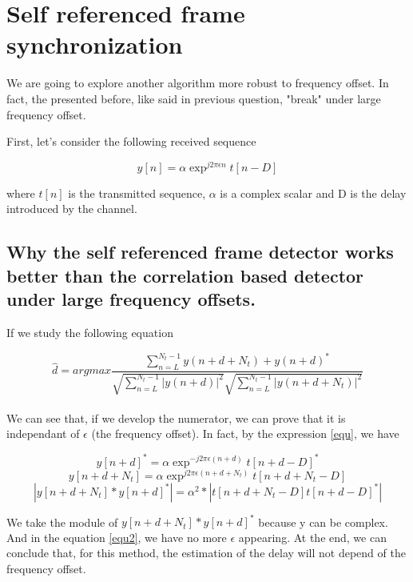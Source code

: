\documentclass[frenchb, oneside, headings=normal]{scrartcl}
\begin{document}
\section{Self referenced frame synchronization}

We are going to explore another algorithm more robust to frequency offset. In fact, the presented before, like said in previous question, "break" under large frequency offset.

First, let's consider the following received sequence

\begin{equation}
y[n] = 	\alpha \exp^{j2\pi \epsilon n}t[n-D]
\label{equ} 
\end{equation}

where $t[n]$ is the transmitted sequence, $\alpha$ is a complex scalar and D is the delay 	introduced by the channel.

\subsection{Why the self referenced frame detector works better than the correlation based detector under large frequency offsets.}

If we study the following equation

\begin{equation}
\hat{d}=argmax \frac{\sum_{n=L}^{N_t-1} y(n+d+N_t)+y(n+d)^*}{\sqrt{\sum_{n=L}^{N_t-1} |y(n+d)|^2}\sqrt{\sum_{n=L}^{N_t-1} |y(n+d+N_t)|^2}}
\end{equation}\\

We can see that, if we develop the numerator, we can prove that it is independant of $\epsilon$ (the frequency offset). In fact, by the expression \ref{equ}, we have

\begin{equation}
y[n+d]^*= \alpha \exp^{-j2\pi \epsilon (n+d)}t[n+d-D]^*
\end{equation}
\begin{equation}
y[n+d+N_t]= \alpha \exp^{j2\pi \epsilon (n+d+N_t)}t[n+d+N_t-D]
\end{equation}
\begin{equation}
|y[n+d+N_t]*y[n+d]^*| = \alpha^2*|t[n+d+N_t-D]t[n+d-D]^*|
\label{equ2}
\end{equation} 	

We take the module of $y[n+d+N_t]*y[n+d]^*$ because y can be complex. And in the equation \ref{equ2}, we have no more $\epsilon$ appearing.
At the end, we can conclude that, for this method, the estimation of the delay will not depend of the frequency offset. 
\end{document}
